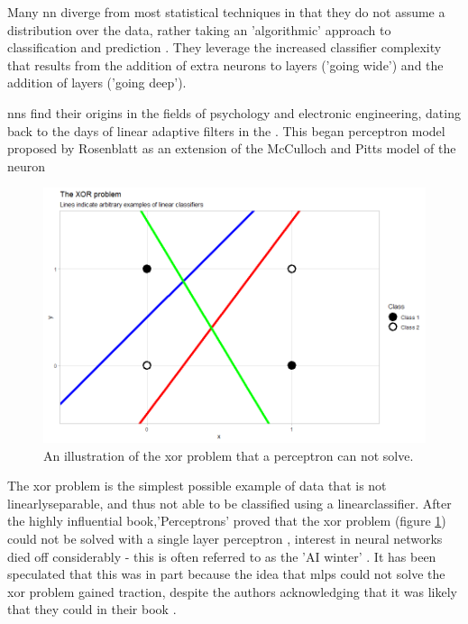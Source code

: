 Many \gls{nn} diverge from most statistical techniques in that they do not assume a distribution over the data, rather taking an 'algorithmic' approach to classification and prediction \cite{two_cultures}. They leverage the increased classifier complexity that results from the addition of extra neurons to layers ('going wide') and the addition of \gls{layer}s ('going deep').

\gls{nn}s find their origins in the fields of psychology and electronic engineering, dating back to the days of linear adaptive filters in the \cite{nns_haykins}. This began perceptron model proposed by Rosenblatt \cite{perceptron_paper} as an extension of the McCulloch and Pitts model of the neuron \cite{logical_calculus} \bigskip

\begin{figure}
    \centering
    \includegraphics[width=120mm]{figs/xor_problem.png}
    \caption{An illustration of the \gls{xor} problem that a perceptron can not solve.}
    \label{fig:xor_problem}
\end{figure}

The \gls{xor} problem is the simplest possible example of data that is not \gls{linearlyseparable}, and thus not able to be classified using a \gls{linearclassifier}. After the highly influential book,'Perceptrons' proved that the \gls{xor} problem (figure \ref{fig:xor_problem}) could not be solved with a single layer perceptron \cite{perceptrons_book}, interest in neural networks died off considerably - this is often referred to as the 'AI winter' \cite{ai_winter}. It has been speculated \cite{ai_winter} that this was in part because the idea that \gls{mlp}s could not solve the \gls{xor} problem gained traction, despite the authors acknowledging that it was likely that they could in their book \cite{perceptron_book}. \bigskip

